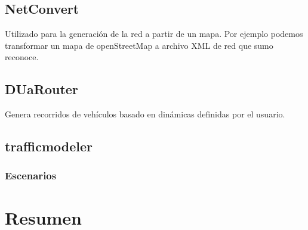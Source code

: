 \subsection{NetConvert}
Utilizado para la generación de la red a partir de un mapa. Por ejemplo podemos transformar un mapa de openStreetMap a archivo XML de red que sumo reconoce.

\subsection{DUaRouter}
 Genera recorridos de vehículos basado en dinámicas definidas por el usuario.

\subsection{trafficmodeler}


\subsubsection{Escenarios}


\section{Resumen}

